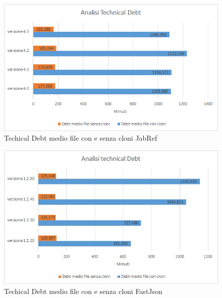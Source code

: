 \begin{figure}[h]
	\centering
	\includegraphics[scale=0.7, trim = 0cm 0cm 0cm 0cm, clip=true]{Grafici_jabRef/TechnicalDebt.png}
	\caption{Techical Debt medio file con e senza cloni JabRef}
	\label{fig:tdJabRef}
\end{figure}
\begin{figure}[h]
	\centering
	\includegraphics[scale=0.7, trim = 0cm 0cm 0cm 0cm, clip=true]{Grafici_fastJson/TechnicalDebt.jpg}
	\caption{Techical Debt medio file con e senza cloni FastJson}
	\label{fig:tdFastjson}
\end{figure}

